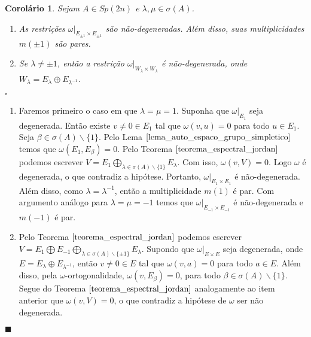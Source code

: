 \documentclass[12pt]{book}
\newtheorem{corolario}[teorema]{Corolário}
\newenvironment{prova}[1]{$\square$ #1}{\hfill$\blacksquare$}
\newcommand{\complementar}[2]{#1 \backslash #2}
\newcommand{\formaSimpletica}[2]{\omega(#1, #2)}
\newcommand{\gruposimpletico}[1]{Sp(#1)}
\begin{document}
	\begin{corolario}\label{corolario_restricao_forma_simpletica}
		Sejam $A \in \gruposimpletico{2n}$ e $\lambda, \mu \in \sigma(A)$. 
		\begin{enumerate}
			\item As restrições $\omega|_{E_{\pm 1} \times E_{\pm 1}}$ são não-degeneradas. Além disso, suas multiplicidades $m(\pm 1)$ são pares.
			
			\item Se $\lambda \neq \pm 1$, então a restrição $\omega|_{W_{\lambda} \times W_{\lambda}}$ é não-degenerada, onde $W_{\lambda } = E_{\lambda} \oplus E_{\lambda^{-1}}$.
		\end{enumerate}
	\end{corolario}
	\begin{prova}
		\begin{enumerate}
			\item  Faremos primeiro o caso em que $\lambda = \mu =1$. Suponha que $\omega|_{E_{1}}$ seja degenerada. Então existe $v\neq 0 \in E_{1}$ tal que $\omega(v, u) = 0$ para todo $u \in E_{1}$. Seja $\beta \in \complementar{\sigma(A)}{\{1 \}}$. Pelo Lema $\ref{lema_auto_espaco_grupo_simpletico}$ temos que $\formaSimpletica{E_{1}}{E_{\beta}} = 0$. Pelo Teorema $\ref{teorema_espectral_jordan}$ podemos escrever $V = E_{1}  \bigoplus_{\lambda \in \complementar{\sigma(A)}{ \{1\}  }}E_{\lambda}$. Com isso, $\formaSimpletica{v}{V} = 0$. Logo $\omega$ é degenerada, o que contradiz a hipótese. Portanto, $\omega|_{E_{1} \times E_{1}}$ é não-degenerada. Além disso, como $\lambda = \lambda^{-1}$, então a multiplicidade $m(1)$ é par. Com argumento análogo para $\lambda = \mu = -1$ temos que $\omega|_{E_{-1} \times E_{-1}}$ é não-degenerada e $m(-1)$ é par. 
			
			\item Pelo Teorema $\ref{teorema_espectral_jordan}$ podemos escrever $V = E_{1}  \bigoplus E_{-1}  \bigoplus_{\lambda \in \complementar{\sigma(A)}{ \{\pm 1\}  }}E_{\lambda}$. Supondo que $\omega|_{E\times E}$ seja degenerada, onde $E= E_{\lambda} \oplus E_{\lambda^{-1}}$, então $v \neq 0 \in E$ tal que 
			$\omega(v,a)=0$ para todo $a\in E$. Além disso, pela $\omega$-ortogonalidade,  $\omega(v,E_{\beta})=0$, para todo $\beta\in \complementar{\sigma(A)}{\{1\} }$. Segue do Teorema $\ref{teorema_espectral_jordan}$ analogamente ao item anterior que $\omega(v,V)=0$, o que contradiz a hipótese de $\omega$ ser não degenerada.
		\end{enumerate}
	\end{prova}
	
\end{document}
